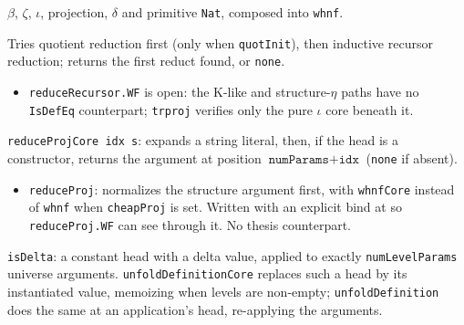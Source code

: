 $\beta$, $\zeta$, $\iota$, projection, $\delta$ and primitive \texttt{Nat}, composed into
\texttt{whnf}.

\begin{definition}
\label{def:kernel-reduce-recursor}
\leanok
{}

 Tries quotient reduction first (only when \texttt{quotInit}), then inductive
recursor reduction; returns the first reduct found, or \texttt{none}.
\begin{itemize}
\item {} \texttt{reduceRecursor.WF} is open: the K-like and structure-$\eta$ paths have
no \texttt{IsDefEq} counterpart; \texttt{trproj} verifies only the pure $\iota$ core beneath it.
\end{itemize}
\end{definition}

\begin{definition}
\label{def:kernel-reduce-proj}
\leanok
{} \texttt{reduceProjCore idx s}: expands a string literal, then, if the head is a
constructor, returns the argument at position $\texttt{numParams}+\texttt{idx}$ (\texttt{none} if
absent).
\begin{itemize}
\item \texttt{reduceProj}: normalizes the structure argument first, with \texttt{whnfCore}
instead of \texttt{whnf} when \texttt{cheapProj} is set. Written with an explicit bind at
 so \texttt{reduceProj.WF} can see through it. No thesis
counterpart.
\end{itemize}
\end{definition}

\begin{definition}
\label{def:kernel-delta-unfold}
\leanok
{}

 \texttt{isDelta}: a constant head with a delta value, applied to exactly
\texttt{numLevelParams} universe arguments. \texttt{unfoldDefinitionCore} replaces such a head by
its instantiated value, memoizing when levels are non-empty; \texttt{unfoldDefinition} does the
same at an application's head, re-applying the arguments.
\end{definition}

